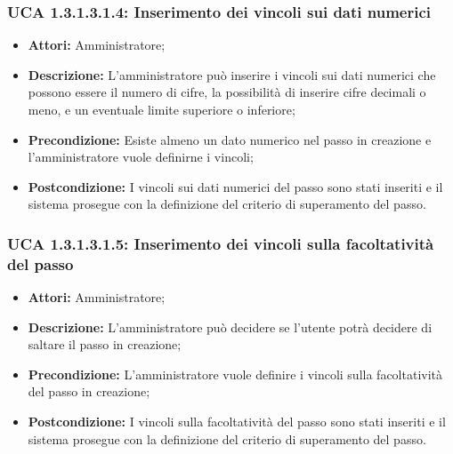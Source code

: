 \subsubsection{UCA 1.3.1.3.1.4: Inserimento dei vincoli sui dati numerici}
\begin{itemize}
\item \textbf{Attori:}
Amministratore;
\item \textbf{Descrizione:}
L'amministratore può inserire i vincoli sui dati numerici che possono essere il numero di cifre, la possibilità di inserire cifre decimali o meno, e un eventuale limite superiore o inferiore;
\item \textbf{Precondizione:}
Esiste almeno un dato numerico nel passo in creazione e l'amministratore vuole definirne i vincoli;
\item \textbf{Postcondizione:}
I vincoli sui dati numerici del passo sono stati inseriti e il sistema prosegue con la definizione del criterio di superamento del passo.
\end{itemize}

\hypertarget{A1.3.1.3.1.5}{}
\subsubsection{UCA 1.3.1.3.1.5: Inserimento dei vincoli sulla facoltatività del passo}
\begin{itemize}
\item \textbf{Attori:}
Amministratore;
\item \textbf{Descrizione:}
L'amministratore può decidere se l'utente potrà decidere di saltare il passo in creazione;
\item \textbf{Precondizione:}
L'amministratore vuole definire i vincoli sulla facoltatività del passo in creazione;
\item \textbf{Postcondizione:}
I vincoli sulla facoltatività del passo sono stati inseriti e il sistema prosegue con la definizione del criterio di superamento del passo.
\end{itemize}

\hypertarget{A1.3.1.3.2}{}
